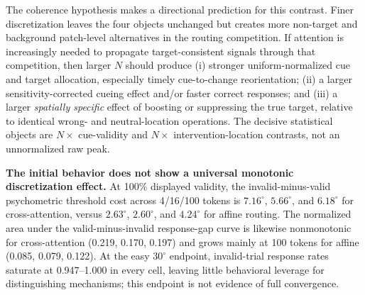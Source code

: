 \documentclass[10pt]{article}
\begin{document}
The coherence hypothesis makes a directional prediction for this contrast. Finer discretization leaves the four objects unchanged but creates more non-target and background patch-level alternatives in the routing competition. If attention is increasingly needed to propagate target-consistent signals through that competition, then larger $N$ should produce (i) stronger uniform-normalized cue and target allocation, especially timely cue-to-change reorientation; (ii) a larger sensitivity-corrected cueing effect and/or faster correct responses; and (iii) a larger \emph{spatially specific} effect of boosting or suppressing the true target, relative to identical wrong- and neutral-location operations. The decisive statistical objects are $N\times$ cue-validity and $N\times$ intervention-location contrasts, not an unnormalized raw peak.

\textbf{The initial behavior does not show a universal monotonic discretization effect.} At 100\% displayed validity, the invalid-minus-valid psychometric threshold cost across 4/16/100 tokens is $7.16^\circ$, $5.66^\circ$, and $6.18^\circ$ for cross-attention, versus $2.63^\circ$, $2.60^\circ$, and $4.24^\circ$ for affine routing. The normalized area under the valid-minus-invalid response-gap curve is likewise nonmonotonic for cross-attention (0.219, 0.170, 0.197) and grows mainly at 100 tokens for affine (0.085, 0.079, 0.122). At the easy $30^\circ$ endpoint, invalid-trial response rates saturate at 0.947--1.000 in every cell, leaving little behavioral leverage for distinguishing mechanisms; this endpoint is not evidence of full convergence.
\end{document}
